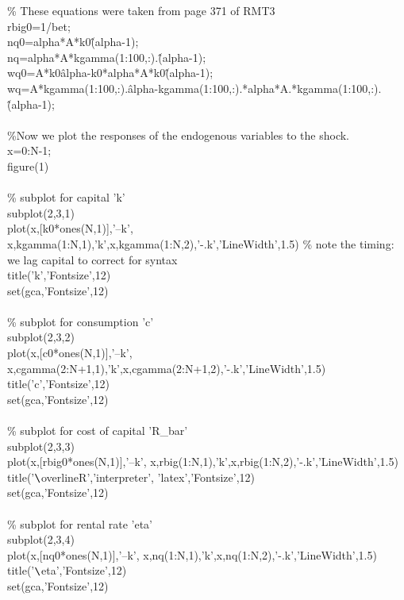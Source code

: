 \documentclass[a4paper,12pt]{scrartcl} %
\begin{document}
{\% These equations were taken from page 371 of RMT3\\
rbig0=1/bet;\\
nq0=alpha*A*k0\^(alpha-1);\\
nq=alpha*A*kgamma(1:100,:).\^(alpha-1);\\
wq0=A*k0\^alpha-k0*alpha*A*k0\^(alpha-1);\\
wq=A*kgamma(1:100,:).\^alpha-kgamma(1:100,:).*alpha*A.*kgamma(1:100,:).\^(alpha-1);\\
\\
\%Now we plot the responses of the endogenous variables to the shock.\\
x=0:N-1;\\
figure(1)\\
\\
\% subplot for capital 'k'\\
subplot(2,3,1)\\
plot(x,[k0*ones(N,1)],'--k', x,kgamma(1:N,1),'k',x,kgamma(1:N,2),'-.k','LineWidth',1.5) \% note the timing: we lag capital to correct for syntax\\
title('k','Fontsize',12)\\
set(gca,'Fontsize',12)\\
\\
\% subplot for consumption 'c'\\
subplot(2,3,2)\\
plot(x,[c0*ones(N,1)],'--k', x,cgamma(2:N+1,1),'k',x,cgamma(2:N+1,2),'-.k','LineWidth',1.5)\\
title('c','Fontsize',12)\\
set(gca,'Fontsize',12)\\
\\
\% subplot for cost of capital 'R\_bar'\\
subplot(2,3,3)\\
plot(x,[rbig0*ones(N,1)],'--k', x,rbig(1:N,1),'k',x,rbig(1:N,2),'-.k','LineWidth',1.5)\\
title('$\verb|\|$overline{R}','interpreter', 'latex','Fontsize',12)\\
set(gca,'Fontsize',12)\\
\\
\% subplot for rental rate 'eta'\\
subplot(2,3,4)\\
plot(x,[nq0*ones(N,1)],'--k', x,nq(1:N,1),'k',x,nq(1:N,2),'-.k','LineWidth',1.5)\\
title('$\verb|\|$eta','Fontsize',12)\\
set(gca,'Fontsize',12)\\
}
\end{document}
